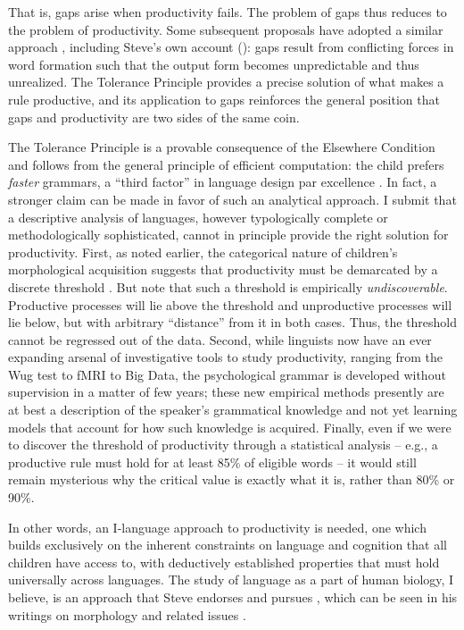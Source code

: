 \documentclass[output=paper,
modfonts
]{LSP/langsci}
\begin{document}
That is, gaps arise when productivity fails. The problem of gaps thus
reduces to the problem of productivity. 
Some subsequent proposals have adopted
a similar approach \citep{Albright2009b, Baronian2005, Hudson2000,
  Maiden2010, Pullum1977, Sims2006}, including Steve's own account
(\citeyear{Anderson2010b}): gaps  result from conflicting
 forces in word formation such that the
output form becomes unpredictable and thus unrealized. The Tolerance
Principle provides a precise solution of what makes a rule
productive, and its application to gaps reinforces the general
position  that gaps and productivity are two sides of the same coin.

The Tolerance Principle is a provable  consequence of the
Elsewhere Condition and follows from the general principle of efficient
computation: the child prefers \textit{faster} grammars, a ``third
factor'' in  language design par excellence \citep{Chomsky2005}.   In
fact, a stronger 
claim can be made in favor of such an analytical approach. I  submit
that a descriptive analysis of languages, however 
 typologically complete or methodologically  sophisticated, cannot 
in principle provide the right solution for productivity.  First, as
noted earlier, the categorical nature of children's morphological
acquisition suggests that productivity must be demarcated by a discrete
threshold \citep[see also][p36]{Aronoff1976}. But note that such  a
threshold is  empirically \textit{undiscoverable}. Productive 
 processes will  lie above the threshold and
unproductive processes will lie below, but with arbitrary ``distance''
from it in both cases. Thus, the threshold 
cannot be regressed out of the data. Second, while linguists now have
an ever expanding arsenal of investigative tools to study
productivity, ranging from the Wug test to fMRI to Big Data, the
psychological grammar is developed without supervision in a matter of
few years; these new
empirical methods presently are at best a description of the speaker's
grammatical knowledge and not yet learning models that account for how such knowledge is acquired. 
 Finally, even if
we were to discover the threshold of productivity through a
statistical analysis -- e.g., a productive
rule must hold for at least 85\% of eligible words -- it would
still remain mysterious why the critical value is exactly what it is,
rather than 80\% or 90\%.   

In other words, an I-language approach to productivity is needed, one
which builds exclusively on the inherent constraints on language and
cognition that all  children have access to, with deductively
established properties that  must hold universally across languages.  
The study of language as a part of human biology, I believe,
is an approach that Steve endorses and pursues  \citep{Anderson2002}, which
can be seen in his writings on  morphology and related issues 
\citep{Anderson2010Ex, Anderson2015}.  
\end{document}
